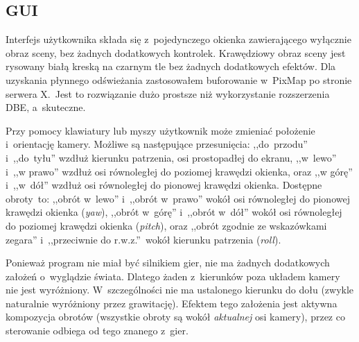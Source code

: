 \documentclass[12pt,a4paper]{article}
\begin{document}
\subsection{GUI}
Interfejs użytkownika składa się z~pojedynczego okienka zawierającego
wyłącznie obraz sceny, bez żadnych dodatkowych kontrolek.
Krawędziowy obraz sceny jest rysowany białą kreską na czarnym tle
bez żadnych dodatkowych efektów.
Dla uzyskania płynnego odświeżania zastosowałem buforowanie
w~\mbox{PixMap} po stronie serwera X.\  Jest to rozwiązanie dużo prostsze
niż wykorzystanie rozszerzenia DBE, a~skuteczne.

Przy pomocy klawiatury lub myszy użytkownik może zmieniać położenie
i~orientację kamery.
Możliwe są następujące przesunięcia:
,,do~przodu'' i~,,do~tyłu'' wzdłuż kierunku patrzenia, osi prostopadłej do ekranu,
,,w~lewo'' i~,,w prawo'' wzdłuż osi równoległej do poziomej krawędzi okienka,
oraz ,,w górę'' i~,,w~dół'' wzdłuż osi równoległej do pionowej krawędzi okienka.
Dostępne obroty~to:
,,obrót w~lewo'' i~,,obrót w~prawo'' wokół osi równoległej do pionowej krawędzi okienka (\textit{yaw}),
,,obrót w~górę'' i~,,obrót w~dół'' wokół osi równoległej do poziomej krawędzi okienka (\textit{pitch}),
oraz
,,obrót zgodnie ze wskazówkami zegara'' i~,,przeciwnie do r.w.z.''\ wokół kierunku patrzenia
(\textit{roll}).

Ponieważ program nie miał być silnikiem gier, nie ma żadnych dodatkowych założeń o~wyglądzie świata.
Dlatego żaden z~kierunków poza układem kamery nie jest wyróżniony.
W~szczególności nie ma ustalonego kierunku do dołu (zwykle naturalnie wyróżniony przez grawitację).
Efektem tego założenia jest aktywna kompozycja obrotów (wszystkie obroty są wokół \textsl{aktualnej}
osi kamery), przez co sterowanie odbiega od tego znanego z~gier.
\end{document}
